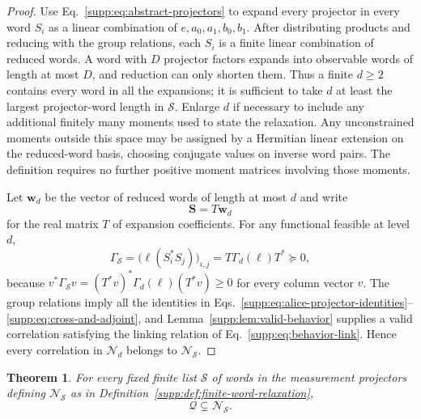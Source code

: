 \documentclass[aps,prl,onecolumn,10pt,superscriptaddress,nofootinbib,longbibliography]{revtex4-2}
\newtheorem{theorem}{Theorem}
\theoremstyle{remark}
\newcommand{\Q}{\mathcal Q}
\begin{document}
\begin{proof}
Use Eq.~\eqref{supp:eq:abstract-projectors} to expand every projector in every word $S_i$ as a linear combination of $e,a_0,a_1,b_0,b_1$. After distributing products and reducing with the group relations, each $S_i$ is a finite linear combination of reduced words. A word with $D$ projector factors expands into observable words of length at most $D$, and reduction can only shorten them. Thus a finite $d\geq2$ contains every word in all the expansions; it is sufficient to take $d$ at least the largest projector-word length in $\mathcal S$. Enlarge $d$ if necessary to include any additional finitely many moments used to state the relaxation. Any unconstrained moments outside this space may be assigned by a Hermitian linear extension on the reduced-word basis, choosing conjugate values on inverse word pairs. The definition requires no further positive moment matrices involving those moments.

Let $\bm w_d$ be the vector of reduced words of length at most $d$ and write
\begin{equation}
\bm S=T\bm w_d
\label{supp:eq:S-Tw}
\end{equation}
for the real matrix $T$ of expansion coefficients. For any functional feasible at level $d$,
\begin{equation}
\Gamma_{\mathcal S}
=\bigl(\ell(S_i^*S_j)\bigr)_{i,j}
=T\Gamma_d(\ell)T^*\succeq0,
\label{supp:eq:congruence}
\end{equation}
because $v^*\Gamma_{\mathcal S}v=(T^*v)^*\Gamma_d(\ell)(T^*v)\geq0$ for every column vector $v$. The group relations imply all the identities in Eqs.~\eqref{supp:eq:alice-projector-identities}--\eqref{supp:eq:cross-and-adjoint}, and Lemma~\ref{supp:lem:valid-behavior} supplies a valid correlation satisfying the linking relation of Eq.~\eqref{supp:eq:behavior-link}. Hence every correlation in $\mathcal N_d$ belongs to $\mathcal N_{\mathcal S}$.
\end{proof}

\begin{theorem}
\label{supp:thm:set-separation}
For every fixed finite list $\mathcal S$ of words in the measurement projectors defining $\mathcal N_{\mathcal S}$ as in Definition~\ref{supp:def:finite-word-relaxation},
\begin{equation}
\Q\subsetneq\mathcal N_{\mathcal S}.
\label{supp:eq:strict-set-inclusion}
\end{equation}
\end{theorem}
\end{document}
